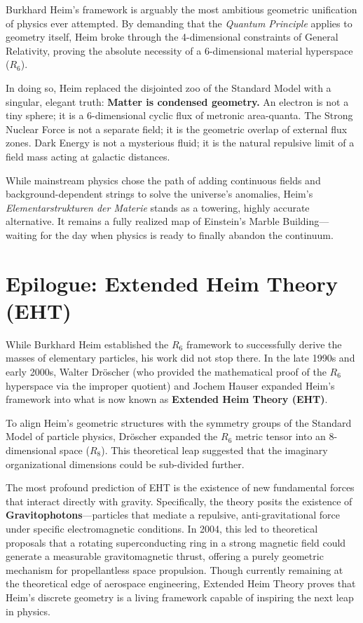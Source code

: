 \documentclass[11pt,a4paper,oneside]{article}
\begin{document}
Burkhard Heim’s framework is arguably the most ambitious geometric unification of physics ever attempted. By demanding that the \textit{Quantum Principle} applies to geometry itself, Heim broke through the 4-dimensional constraints of General Relativity, proving the absolute necessity of a 6-dimensional material hyperspace ($R_6$). 

In doing so, Heim replaced the disjointed zoo of the Standard Model with a singular, elegant truth: \textbf{Matter is condensed geometry.} An electron is not a tiny sphere; it is a 6-dimensional cyclic flux of metronic area-quanta. The Strong Nuclear Force is not a separate field; it is the geometric overlap of external flux zones. Dark Energy is not a mysterious fluid; it is the natural repulsive limit of a field mass acting at galactic distances.

While mainstream physics chose the path of adding continuous fields and background-dependent strings to solve the universe's anomalies, Heim's \textit{Elementarstrukturen der Materie} stands as a towering, highly accurate alternative. It remains a fully realized map of Einstein's Marble Building—waiting for the day when physics is ready to finally abandon the continuum.

\section{Epilogue: Extended Heim Theory (EHT)}
\label{sec:eht}

While Burkhard Heim established the $R_6$ framework to successfully derive the masses of elementary particles, his work did not stop there. In the late 1990s and early 2000s, Walter Dröscher (who provided the mathematical proof of the $R_6$ hyperspace via the improper quotient) and Jochem Hauser expanded Heim's framework into what is now known as \textbf{Extended Heim Theory (EHT)}.

To align Heim's geometric structures with the symmetry groups of the Standard Model of particle physics, Dröscher expanded the $R_6$ metric tensor into an 8-dimensional space ($R_8$). This theoretical leap suggested that the imaginary organizational dimensions could be sub-divided further.

The most profound prediction of EHT is the existence of new fundamental forces that interact directly with gravity. Specifically, the theory posits the existence of \textbf{Gravitophotons}—particles that mediate a repulsive, anti-gravitational force under specific electromagnetic conditions. In 2004, this led to theoretical proposals that a rotating superconducting ring in a strong magnetic field could generate a measurable gravitomagnetic thrust, offering a purely geometric mechanism for propellantless space propulsion. Though currently remaining at the theoretical edge of aerospace engineering, Extended Heim Theory proves that Heim's discrete geometry is a living framework capable of inspiring the next leap in physics.
\end{document}

